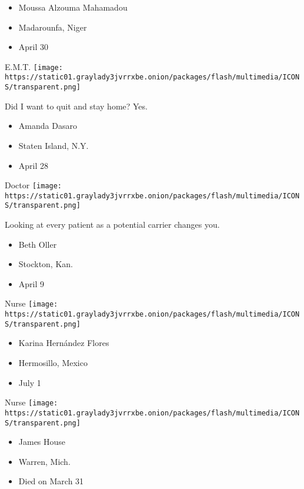 \begin{itemize}
\tightlist
\item
  Moussa Alzouma Mahamadou
\item
  Madarounfa, Niger
\item
  April 30
\end{itemize}

\protect\hyperlink{item-amanda-dasaro}{}

E.M.T.
\texttt{[image: https://static01.graylady3jvrrxbe.onion/packages/flash/multimedia/ICONS/transparent.png]}

Did I want to quit and stay home? Yes.

\begin{itemize}
\tightlist
\item
  Amanda Dasaro
\item
  Staten Island, N.Y.
\item
  April 28
\end{itemize}

\protect\hyperlink{item-beth-oller}{}

Doctor
\texttt{[image: https://static01.graylady3jvrrxbe.onion/packages/flash/multimedia/ICONS/transparent.png]}

Looking at every patient as a potential carrier changes you.

\begin{itemize}
\tightlist
\item
  Beth Oller
\item
  Stockton, Kan.
\item
  April 9
\end{itemize}

\protect\hyperlink{item-karina-hernandez-flores}{}

Nurse
\texttt{[image: https://static01.graylady3jvrrxbe.onion/packages/flash/multimedia/ICONS/transparent.png]}

\begin{itemize}
\tightlist
\item
  Karina Hernández Flores
\item
  Hermosillo, Mexico
\item
  July 1
\end{itemize}

\protect\hyperlink{item-james-house}{}

Nurse
\texttt{[image: https://static01.graylady3jvrrxbe.onion/packages/flash/multimedia/ICONS/transparent.png]}

\begin{itemize}
\tightlist
\item
  James House
\item
  Warren, Mich.
\item
  Died on March 31
\end{itemize}

